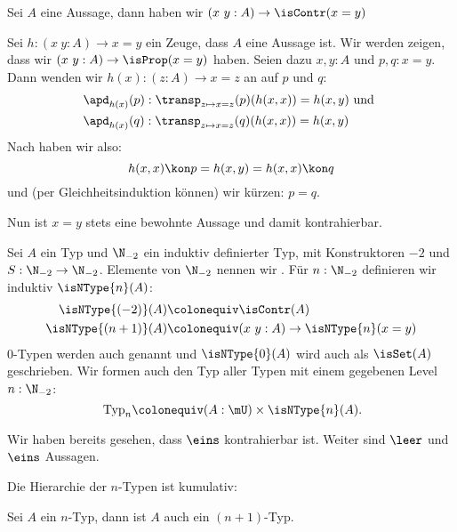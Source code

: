 \begin{lemma}
  \label{prop-id-contractible}
  Sei $A$ eine Aussage, dann haben wir
   $(x\ y :A)\to \isContr(x=y)$
\end{lemma}

\begin{beweis}
  Sei $h:(x\ y : A)\to x=y$ ein Zeuge, dass $A$ eine Aussage ist.
   Wir werden zeigen, dass wir $(x\ y : A)\to \isProp(x=y)$ haben.
    Seien dazu $x,y:A$ und $p,q:x=y$. Dann wenden wir $h(x):(z:A)\to x=z$ an auf $p$ und $q$:
    \begin{align*}
      &\apd_{h(x)}(p):\transp_{z\mapsto x=z}(p)(h(x,x))=h(x,y)\text{ und } \\
      &\apd_{h(x)}(q):\transp_{z\mapsto x=z}(q)(h(x,x))=h(x,y)
    \end{align*}
  Nach  haben wir also:
  \[
    h(x,x)\kon p=h(x,y)=h(x,x)\kon q
  \]
  und (per Gleichheitsinduktion können) wir kürzen: $p=q$.

  Nun ist $x=y$ stets eine bewohnte Aussage und damit kontrahierbar.
\end{beweis}

\begin{definition}
  Sei $A$ ein Typ und $\N_{-2}$ ein induktiv definierter Typ,
  mit Konstruktoren $-2$ und $S:\N_{-2}\to\N_{-2}$.
  Elemente von $\N_{-2}$ nennen wir .
  Für $n:\N_{-2}$ definieren wir induktiv $\isNType{n}(A)$:
  \begin{align*}
    \isNType{(-2)}(A)&\colonequiv \isContr(A) \\
    \isNType{(n+1)}(A)&\colonequiv (x\ y : A)\to \isNType{n}(x=y)
  \end{align*}
  $0$-Typen werden auch  genannt und $\isNType{0}(A)$ wird auch als $\isSet(A)$ geschrieben.
  Wir formen auch den Typ aller Typen mit einem gegebenen Level $n:\N_{-2}$:
  \[
    \mathrm{Typ}_n\colonequiv (A : \mU) \times \isNType{n}(A)\rlap{.}
  \]
\end{definition}

\begin{beispiel}
  Wir haben bereits gesehen, dass $\eins$ kontrahierbar ist.
  Weiter sind $\leer$ und $\eins$ Aussagen.
\end{beispiel}

Die Hierarchie der $n$-Typen ist kumulativ:

\begin{lemma}
  Sei $A$ ein $n$-Typ, dann ist $A$ auch ein $(n+1)$-Typ.
\end{lemma}

